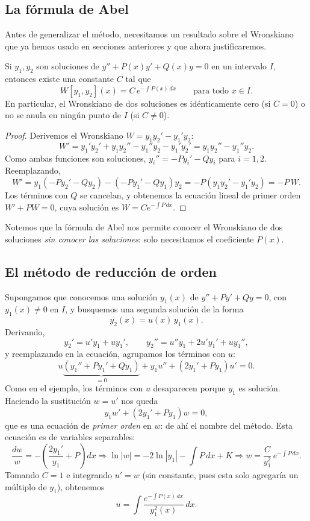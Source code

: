 \subsection*{La f\'ormula de Abel}

Antes de generalizar el m\'etodo, necesitamos un resultado sobre el Wronskiano que ya hemos usado en secciones anteriores y que ahora justificaremos.

\begin{theorem}
    Si $y_1,y_2$ son soluciones de $y''+P(x)y'+Q(x)y=0$ en un intervalo $I$, entonces existe una constante $C$ tal que
    \[
    W[y_1,y_2](x)=C\,e^{-\int P(x)\,dx}\qquad\text{para todo } x\in I.
    \]
    En particular, el Wronskiano de dos soluciones es id\'enticamente cero (si $C=0$) o no se anula en ning\'un punto de $I$ (si $C\neq0$).
\end{theorem}

\begin{proof}
    Derivemos el Wronskiano $W=y_1y_2'-y_1'y_2$:
    \[
    W'=y_1'y_2'+y_1y_2''-y_1''y_2-y_1'y_2'=y_1y_2''-y_1''y_2.
    \]
    Como ambas funciones son soluciones, $y_i''=-Py_i'-Qy_i$ para $i=1,2$. Reemplazando,
    \[
    W'=y_1\left(-Py_2'-Qy_2\right)-\left(-Py_1'-Qy_1\right)y_2=-P\left(y_1y_2'-y_1'y_2\right)=-P\,W.
    \]
    Los t\'erminos con $Q$ se cancelan, y obtenemos la ecuaci\'on lineal de primer orden $W'+PW=0$, cuya soluci\'on es $W=Ce^{-\int P\,dx}$.
\end{proof}

Notemos que la f\'ormula de Abel nos permite conocer el Wronskiano de dos soluciones \emph{sin conocer las soluciones}: solo necesitamos el coeficiente $P(x)$.

\subsection*{El m\'etodo de reducci\'on de orden}

\begin{remark}
    Supongamos que conocemos una soluci\'on $y_1(x)$ de $y''+Py'+Qy=0$, con $y_1(x)\neq0$ en $I$, y busquemos una segunda soluci\'on de la forma
    \[
    y_2(x)=u(x)\,y_1(x).
    \]
    Derivando,
    \[
    y_2'=u'y_1+uy_1',\qquad y_2''=u''y_1+2u'y_1'+uy_1'',
    \]
    y reemplazando en la ecuaci\'on, agrupamos los t\'erminos con $u$:
    \[
    u\underbrace{\left(y_1''+Py_1'+Qy_1\right)}_{=0}+y_1u''+\left(2y_1'+Py_1\right)u'=0.
    \]
    Como en el ejemplo, los t\'erminos con $u$ desaparecen porque $y_1$ es soluci\'on. Haciendo la sustituci\'on $w=u'$ nos queda
    \[
    y_1w'+\left(2y_1'+Py_1\right)w=0,
    \]
    que es una ecuaci\'on de \emph{primer orden} en $w$: de ah\'i el nombre del m\'etodo. Esta ecuaci\'on es de variables separables:
    \[
    \dfrac{dw}{w}=-\left(\dfrac{2y_1'}{y_1}+P\right)dx\Longrightarrow \ln|w|=-2\ln|y_1|-\int P\,dx+K\Longrightarrow w=\dfrac{C}{y_1^2}\,e^{-\int P\,dx}.
    \]
    Tomando $C=1$ e integrando $u'=w$ (sin constante, pues esta solo agregar\'ia un m\'ultiplo de $y_1$), obtenemos
    \[
    u=\int\dfrac{e^{-\int P(x)\,dx}}{y_1^2(x)}\,dx.
    \]
\end{remark}

